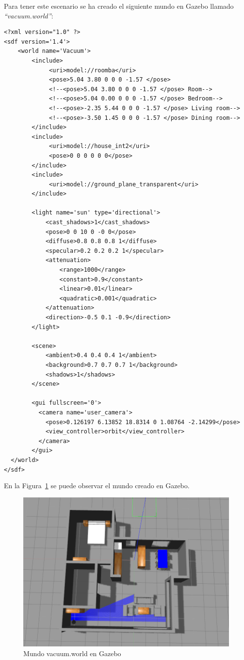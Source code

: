 Para tener este escenario se ha creado el siguiente mundo en Gazebo llamado \textit{``vacuum.world''}:

\vspace{20pt}
	\begin{lstlisting}[frame=single]
<?xml version="1.0" ?>
<sdf version='1.4'>
	<world name='Vacuum'>
    	<include>
    	     <uri>model://roomba</uri>
    	     <pose>5.04 3.80 0 0 0 -1.57 </pose>
    	  	 <!--<pose>5.04 3.80 0 0 0 -1.57 </pose> Room-->
    	  	 <!--<pose>5.04 0.00 0 0 0 -1.57 </pose> Bedroom-->
    	  	 <!--<pose>-2.35 5.44 0 0 0 -1.57 </pose> Living room-->
    	  	 <!--<pose>-3.50 1.45 0 0 0 -1.57 </pose> Dining room-->
    	</include>
    	<include>
    	     <uri>model://house_int2</uri>
    	  	 <pose>0 0 0 0 0 0</pose>
    	</include>
		<include>
    	     <uri>model://ground_plane_transparent</uri>
    	</include>
    	
    	<light name='sun' type='directional'>
      		<cast_shadows>1</cast_shadows>
      		<pose>0 0 10 0 -0 0</pose>
      		<diffuse>0.8 0.8 0.8 1</diffuse>
      		<specular>0.2 0.2 0.2 1</specular>
      		<attenuation>
        		<range>1000</range>
        		<constant>0.9</constant>
        		<linear>0.01</linear>
        		<quadratic>0.001</quadratic>
      		</attenuation>
      		<direction>-0.5 0.1 -0.9</direction>
    	</light>
    
		<scene>
		  	<ambient>0.4 0.4 0.4 1</ambient>
		  	<background>0.7 0.7 0.7 1</background>
		  	<shadows>1</shadows>
		</scene>
    
		<gui fullscreen='0'>
		  <camera name='user_camera'>
		    <pose>0.126197 6.13852 18.8314 0 1.08764 -2.14299</pose>
		    <view_controller>orbit</view_controller>
		  </camera>
		</gui>
  </world>
</sdf>

	\end{lstlisting}


En la Figura~\ref{fig.vacuumWorld} se puede observar el mundo creado en Gazebo.

\begin{figure}[H]
  \begin{center}
    \includegraphics[width=1.0\textwidth]{figures/Vacuum/vacuumWorld.png}
		\caption{Mundo vacuum.world en Gazebo}
		\label{fig.vacuumWorld}
		\end{center}
\end{figure}


